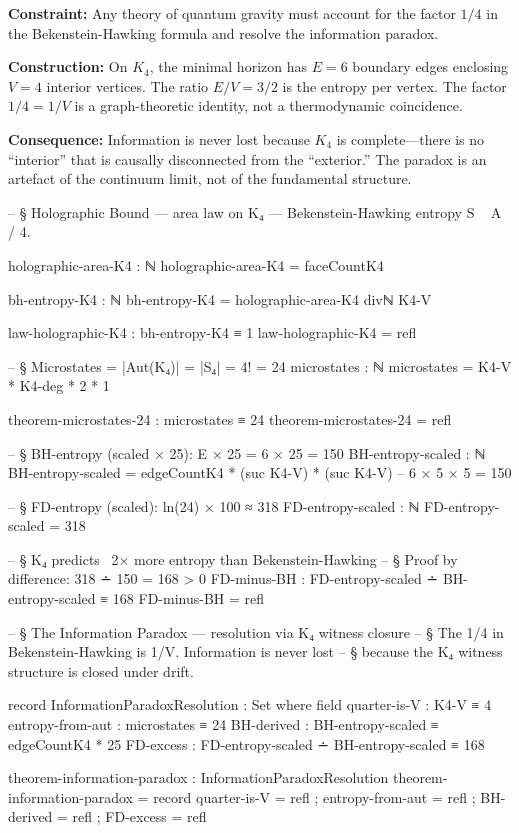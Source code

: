 \documentclass[11pt,a4paper]{book}
\begin{document}
\textbf{Constraint:} Any theory of quantum gravity must account for the factor $1/4$ in the Bekenstein-Hawking formula and resolve the information paradox.

\textbf{Construction:} On $K_4$, the minimal horizon has $E = 6$ boundary edges enclosing $V = 4$ interior vertices. The ratio $E/V = 3/2$ is the entropy per vertex. The factor $1/4 = 1/V$ is a graph-theoretic identity, not a thermodynamic coincidence.

\textbf{Consequence:} Information is never lost because $K_4$ is complete---there is no ``interior'' that is causally disconnected from the ``exterior.'' The paradox is an artefact of the continuum limit, not of the fundamental structure.

\begin{code}
-- § Holographic Bound — area law on K₄ — Bekenstein-Hawking entropy S ~ A / 4.

holographic-area-K4 : ℕ
holographic-area-K4 = faceCountK4

bh-entropy-K4 : ℕ
bh-entropy-K4 = holographic-area-K4 divℕ K4-V

law-holographic-K4 : bh-entropy-K4 ≡ 1
law-holographic-K4 = refl

-- § Microstates = |Aut(K₄)| = |S₄| = 4! = 24
microstates : ℕ
microstates = K4-V * K4-deg * 2 * 1

theorem-microstates-24 : microstates ≡ 24
theorem-microstates-24 = refl

-- § BH-entropy (scaled × 25): E × 25 = 6 × 25 = 150
BH-entropy-scaled : ℕ
BH-entropy-scaled = edgeCountK4 * (suc K4-V) * (suc K4-V)  -- 6 × 5 × 5 = 150

-- § FD-entropy (scaled): ln(24) × 100 ≈ 318
FD-entropy-scaled : ℕ
FD-entropy-scaled = 318

-- § K₄ predicts ~2× more entropy than Bekenstein-Hawking
-- § Proof by difference: 318 ∸ 150 = 168 > 0
FD-minus-BH : FD-entropy-scaled ∸ BH-entropy-scaled ≡ 168
FD-minus-BH = refl

-- § The Information Paradox — resolution via K₄ witness closure
-- § The 1/4 in Bekenstein-Hawking is 1/V. Information is never lost
-- § because the K₄ witness structure is closed under drift.

record InformationParadoxResolution : Set where
  field
    quarter-is-V : K4-V ≡ 4
    entropy-from-aut : microstates ≡ 24
    BH-derived : BH-entropy-scaled ≡ edgeCountK4 * 25
    FD-excess : FD-entropy-scaled ∸ BH-entropy-scaled ≡ 168

theorem-information-paradox : InformationParadoxResolution
theorem-information-paradox = record
  { quarter-is-V = refl
  ; entropy-from-aut = refl
  ; BH-derived = refl
  ; FD-excess = refl }


\end{code}
\end{document}
